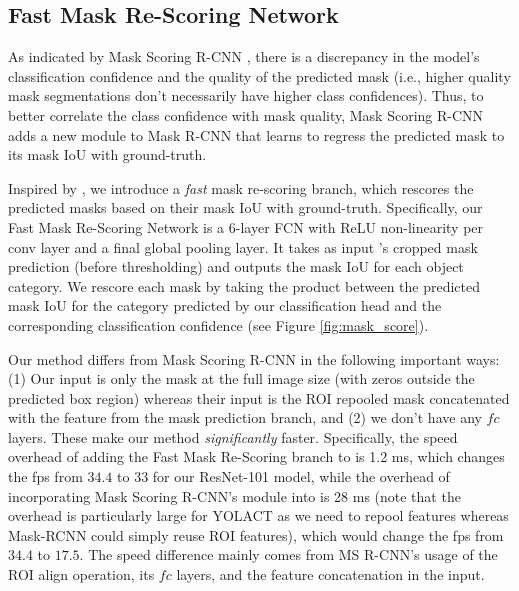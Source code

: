 \documentclass[10pt,journal,compsoc]{IEEEtran}
\begin{document}
\subsection{Fast Mask Re-Scoring Network}
As indicated by Mask Scoring R-CNN \cite{huang-msrcnn2018}, there is a discrepancy in the model's classification confidence and the quality of the predicted mask (i.e., higher quality mask segmentations don't necessarily have higher class confidences).  Thus, to better correlate the class confidence with mask quality, Mask Scoring R-CNN adds a new module to Mask R-CNN that learns to regress the predicted mask to its mask IoU with ground-truth.   

Inspired by \cite{huang-msrcnn2018}, we introduce a \emph{fast} mask re-scoring branch, which rescores the predicted masks based on their mask IoU with ground-truth.  Specifically, our Fast Mask Re-Scoring Network is a 6-layer FCN with ReLU non-linearity per conv layer and a final global pooling layer.  It takes as input \methodname{}'s cropped mask prediction (before thresholding) and outputs the mask IoU for each object category. We rescore each mask by taking the product between the predicted mask IoU for the category predicted by our classification head and the corresponding classification confidence (see Figure \ref{fig:mask_score}). 

Our method differs from Mask Scoring R-CNN \cite{huang-msrcnn2018} in the following important ways: (1) Our input is only the mask at the full image size (with zeros outside the predicted box region) whereas their input is the ROI repooled mask concatenated with the feature from the mask prediction branch, and (2) we don't have any $fc$ layers. These make our method \emph{significantly} faster. Specifically, the speed overhead of adding the Fast Mask Re-Scoring branch to \methodname{} is 1.2 ms, which changes the fps from $34.4$ to $33$ for our ResNet-101 model, while the overhead of incorporating Mask Scoring R-CNN's module into \methodname{} is 28 ms (note that the overhead is particularly large for YOLACT as we need to repool features whereas Mask-RCNN could simply reuse ROI features), which would change the fps from $34.4$ to $17.5$. The speed difference mainly comes from MS R-CNN's usage of the ROI align operation, its $fc$ layers, and the feature concatenation in the input.
\end{document}
